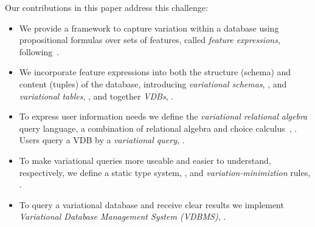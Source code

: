 Our contributions in this paper address this challenge:
\begin{itemize}[leftmargin=*]
\itemsep0em
\item We provide a framework to capture variation within a database using
propositional formulas over  
sets of features, called \emph{feature expressions}, following~\cite{vdb17ATW}.
\item We incorporate feature expressions  into both the structure (schema) and
content (tuples) of the database, introducing \emph{variational schemas}, , 
and \emph{variational tables}, , and together \emph{VDBs},
.
\item To express user information needs we define the 
\emph{variational relational algebra} query language,
a combination of relational algebra and 
choice calculus~\cite{EW11tosem,Walk13thesis}, .
Users query a VDB by a \emph{variational query}, .
\item 
To make variational queries more useable and easier to understand, respectively,
we define 
a static type system, ,
and \emph{variation-minimiztion} rules, .
\item To query a 
variational database and receive clear results
we implement \emph{Variational Database Management System (VDBMS)}, .
\end{itemize}

